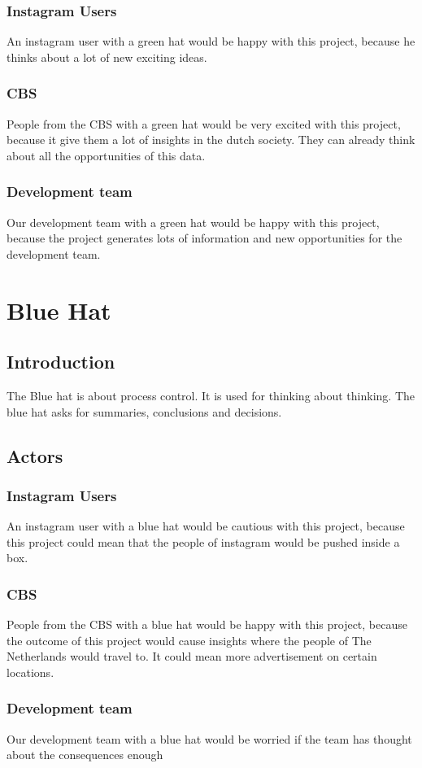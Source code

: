 \documentclass{article}
\begin{document}
        \subsubsection{Instagram Users}
            An instagram user with a green hat would be happy with this project, because he thinks about a lot of new exciting ideas. 
        
        \subsubsection{CBS}
            People from the CBS with a green hat would be very excited with this project, because it give them a lot of insights in the dutch society. They can already think about all the opportunities of this data.
        
        \subsubsection{Development team}
            Our development team with a green hat would be happy with this project, because the project generates lots of information and new opportunities for the development team.
\pagebreak

\section{Blue Hat}
    \subsection{Introduction}
        The Blue hat is about process control. It is used for thinking about thinking. The blue hat asks for summaries, conclusions and decisions.

    \subsection{Actors}
        \subsubsection{Instagram Users}
            An instagram user with a blue hat would be cautious with this project, because this project could mean that the people of instagram would be pushed inside a box.
            
        \subsubsection{CBS}
            People from the CBS with a blue hat would be happy with this project, because the outcome of this project would cause insights where the people of The Netherlands would travel to. It could mean more advertisement on certain locations.
        
        \subsubsection{Development team}
            Our development team with a blue hat would be worried if the team has thought about the consequences enough 
        
\pagebreak

\printglossary[type=\acronymtype,title=\section{Abbreviations}]
\end{document}
